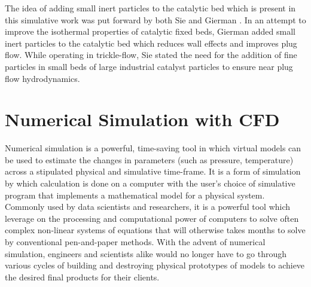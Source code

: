 The idea of adding small inert particles to the catalytic bed which is present in this simulative work was put forward by both Sie \cite{Sie1996} and Gierman \cite{Gierman1988}. In an attempt to improve the isothermal properties of catalytic fixed beds, Gierman \cite{Gierman1988} added small inert particles to the catalytic bed which reduces wall effects and improves plug flow. While operating in trickle-flow, Sie \cite{Sie1996} stated the need for the addition of fine particles in small beds of large industrial catalyst particles to ensure near plug flow hydrodynamics.
\section{Numerical Simulation with CFD}
Numerical simulation is a powerful, time-saving tool in which virtual models can be used to estimate the changes in parameters (such as pressure, temperature) across a stipulated physical and simulative time-frame. It is a form of simulation by which calculation is done on a computer with the user's choice of simulative program that implements a mathematical model for a physical system. Commonly used by data scientists and researchers, it is a powerful tool which leverage on the processing and computational power of computers to solve often complex non-linear systems of equations that will otherwise takes months to solve by conventional pen-and-paper methods. With the advent of numerical simulation, engineers and scientists alike would no longer have to go through various cycles of building and destroying physical prototypes of models to achieve the desired final products for their clients.

